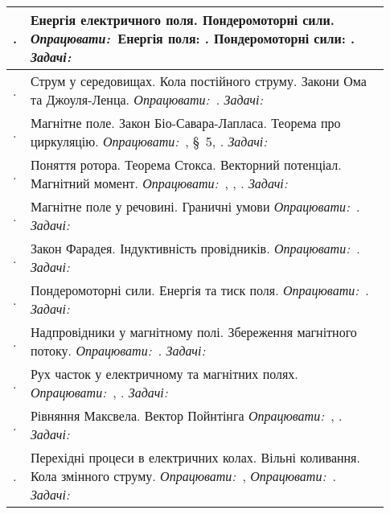 \documentclass{Syllabus}
\def\lit{\textit{Опрацювати:\ }}
\def\probl{\textit{Задачі:\ }}
\begin{document}
\begin{center}
\begin{longtable}{|>{\arraybackslash}m{0.03\linewidth}|>{\raggedright\arraybackslash}m{0.9\linewidth}|}
		\\\hline
		\rownumber. & Енергія електричного поля. Пондеромоторні сили.
		\newline \lit{}Енергія поля: \cite[\S~28, 29, 30]{Siv3}. Пондеромоторні сили: \cite[\S~32, 33]{Siv3}. \probl{}\cite[\S\ 1.8, 1.9]{Ponomarenko}
		\\\hline
		\rownumber. & Струм у середовищах. Кола постійного струму. Закони Ома та Джоуля-Ленца.
		\newline \lit{}\cite[Глава V]{ZilbermanElectro}. \probl{}\cite[\S\S\ 2.1, 2.2, 2.3]{Ponomarenko}
		\\\hline
		\rownumber. & Магнітне поле. Закон Біо-Савара-Лапласа. Теорема про циркуляцію.
		\newline \lit{}\cite[Глава I]{ZilbermanElectro},  \S~5, \cite[\S~42, 47]{Siv3}. \probl{}\cite[\S\ 3.1]{Ponomarenko}
		\\\hline
		\rownumber. & Поняття ротора. Теорема Стокса. Векторний потенціал. Магнітний момент.
		\newline \lit{}\cite[Глава VII, \S~80]{ZilbermanElectro}, \cite[\S~49, 50]{Siv3}, \cite[6.2 -- 6.5]{berkeley2}. \probl{}\cite[\S\ 3.2]{Ponomarenko}
		\\\hline
		\rownumber. & Магнітне поле у речовині. Гра\-ничні умови
		\newline \lit{}\cite[Глава VIII]{ZilbermanElectro}. \probl{}\cite[\S\ 3.3]{Ponomarenko}
		\\\hline
		\rownumber. & Закон Фарадея. Індуктивність провідників.
		\newline \lit{}\cite[Глава IX]{Kalashnikov}. \probl{}\cite[\S\ 4.1]{Ponomarenko}
		\\\hline
		\rownumber. & Пондеромоторні сили. Енергія та тиск поля.
		\newline \lit{}\cite[Глава X]{Kalashnikov}. \probl{}\cite[\S\ 3.4]{Ponomarenko}
		\\\hline
		\rownumber. & Надпровідники у магнітному полі. Збереження магнітного потоку.
		\newline \lit{}\cite[\S~90]{Siv3}. \probl{}\cite[\S\ 4.2]{Ponomarenko}
		\\\hline
		\rownumber. & Рух часток у електричному та магнітних полях.
		\newline \lit{}\cite[Глава V]{Siv3}, \cite[Глава XVII]{Kalashnikov}. \probl{}\cite[Розділ 5]{Ponomarenko}
		\\\hline
		\rownumber. & Рівняння Максвела. Вектор Пой\-н\-тін\-га
		\newline \lit{}\cite[Глава IV]{Siv3}, \cite[Глава XIII]{Kalashnikov}. \probl{}\cite[\S\ 4.3]{Ponomarenko}
		\\\hline
		\rownumber. & Перехідні процеси в електричних колах. Вільні коливання. Кола змінного струму.
		\newline \lit{}\cite[Глава IV]{Siv3}, \lit{}\cite[Глава XX]{Kalashnikov}. \probl{}\cite[Розділ 7]{Ponomarenko}
		\\\hline
	\end{longtable}
\end{center}
\end{document}
